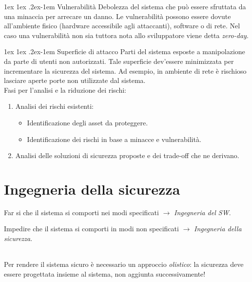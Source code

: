 \documentclass[a4paper, 11pt, twoside, openright, fleqn]{report}
\makeatletter
\renewcommand{\paragraph}{%
	\@startsection{paragraph}{4}%
	{\z@}{1ex \@plus 1ex \@minus .2ex}{-1em}%
	{\normalfont\normalsize\bfseries}%
}
\makeatother
\begin{document}
\paragraph{Vulnerabilità}
Debolezza del sistema che può essere sfruttata da una minaccia per arrecare un danno.
Le vulnerabilità possono essere dovute all'ambiente fisico (hardware accessibile agli attaccanti), software o di rete. Nel caso una vulnerabilità non sia tuttora nota allo sviluppatore viene detta \emph{zero-day}.

\paragraph{Superficie di attacco}
Parti del sistema esposte a manipolazione da parte di utenti non autorizzati. Tale superficie dev'essere minimizzata per incrementare la sicurezza del sistema. Ad esempio, in ambiente di rete è rischioso lasciare aperte porte non utilizzate dal sistema.\\

\clearpage
\noindent Fasi per l'analisi e la riduzione dei rischi:
\begin{enumerate}
	\item Analisi dei rischi esistenti:
	\begin{itemize}
		\item Identificazione degli asset da proteggere.
		\item Identificazione dei rischi in base a minacce e vulnerabilità.
	\end{itemize}
	\item Analisi delle soluzioni di sicurezza proposte e dei trade-off che ne derivano.
\end{enumerate}


\section{Ingegneria della sicurezza}
\begin{minipage}{0.45\textwidth}
	Far si che il sistema si comporti nei modi specificati $\rightarrow$ \emph{Ingegneria del SW}.
\end{minipage}
\hfill
\begin{minipage}{0.48\textwidth}
	Impedire che il sistema si comporti in modi non specificati $\rightarrow$ \emph{Ingegneria della sicurezza}.
\end{minipage}\\[1em]
Per rendere il sistema sicuro è necessario un approccio \emph{olistico}: la sicurezza deve essere progettata insieme al sistema, non aggiunta successivamente!
\end{document}
